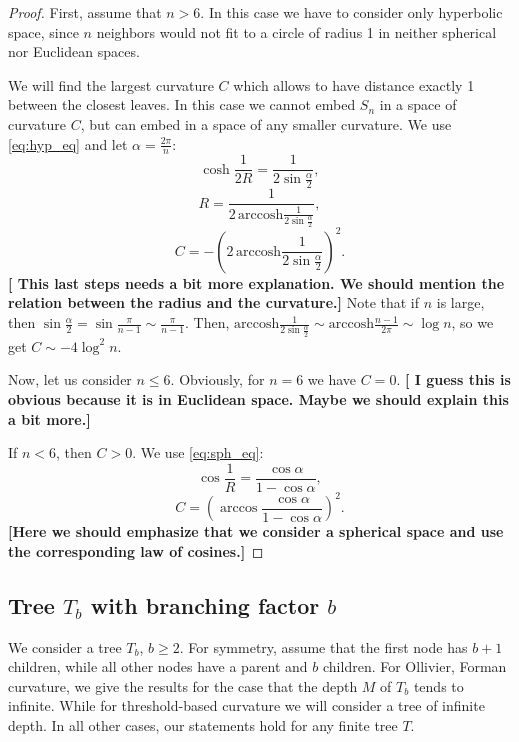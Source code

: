 \documentclass[runningheads]{llncs}
\newcommand{\ch}[1]{{\color{red} #1}}
\begin{document}
\begin{proof}
First, assume that $n > 6$. In this case we have to consider only hyperbolic space, since $n$ neighbors would not fit to a circle of radius 1 in neither spherical nor Euclidean spaces.

We will find \ch{the} largest curvature $C$ which allows to have distance exactly 1 between the closest leaves. In this case we cannot embed $S_n$ in a space of curvature $C$, but can embed in a space of any smaller curvature. 
We use \eqref{eq:hyp_eq} and let $\alpha = \frac{2\pi}{n}$:
\[
\cosh\frac{1}{2R} = \frac{1}{2\sin \frac{\alpha}{2}},
\]
\[
R = \frac{1}{2\,\textrm{arccosh}\frac{1}{2\sin \frac{\alpha}{2}}},
\]
\[
C = - \left(2\,\textrm{arccosh}\frac{1}{2\sin \frac{\alpha}{2}}\right)^2.
\]
\textbf{[ This last steps needs a bit more explanation. We should mention the relation between the radius and the curvature.]}
Note that if $n$ is large, then $\sin \frac{\alpha}{2} = \sin\frac{\pi}{n-1} \sim \frac{\pi}{n-1}$. Then,  $\textrm{arccosh}\frac{1}{2\sin \frac{\alpha}{2}} \sim \textrm{arccosh}\frac{n-1}{2\pi} \sim \log n$, so we get $C \sim - 4 \log^2 n$. 

Now, let us consider $n \le 6$. Obviously, for $n = 6$ we have $C = 0$. \textbf{[ I guess this is obvious because it is in Euclidean space. Maybe we should explain this a bit more.]}

If $n < 6$, then $C > 0$. We use \eqref{eq:sph_eq}:
\[
\cos{\frac{1}{R}} = \frac{\cos \alpha}{1 - \cos \alpha},
\]
\[
C = \left(\arccos \frac{\cos \alpha}{1 - \cos \alpha}\right)^2.
\]
\textbf{[Here we should emphasize that we consider a spherical space and use the corresponding law of cosines.]}
\end{proof}

\subsection{Tree $T_b$ with branching factor $b$}

We consider a tree $T_b$, $b \ge 2$. For symmetry, assume that the first node has $b+1$ children, while all other nodes have a parent and $b$ children. \ch{For Ollivier, Forman curvature, we give the results for the case that the depth $M$ of $T_b$ tends to infinite. While for threshold-based curvature we will consider a tree of infinite depth.} In \ch{all} other cases, our statements hold for any finite tree $T$.
\end{document}
